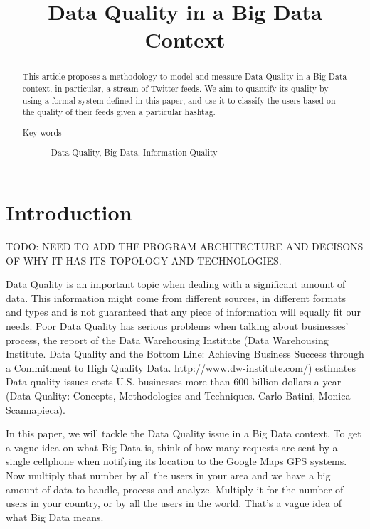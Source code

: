 \documentclass[%
 reprint,
 amsmath,amssymb,
 aps,
]{revtex4-1}
\begin{document}

\title{Data Quality in a Big Data Context}%

\begin{abstract}
This article proposes a methodology to model and measure Data Quality in a Big Data context, in particular, a stream of Twitter feeds. We aim to quantify its quality by using a formal system defined in this paper, and use it to classify the users based on the quality of their feeds given a particular hashtag.
\begin{description}
\item[Key words]
Data Quality, Big Data, Information Quality
\end{description}
\end{abstract}

\maketitle


\section{\label{sec:level1}Introduction}

TODO: NEED TO ADD THE PROGRAM ARCHITECTURE AND DECISONS OF WHY IT HAS ITS TOPOLOGY AND TECHNOLOGIES. 


Data Quality is an important topic when dealing with a significant amount of data. This information might come from different sources, in different formats and types and is not guaranteed that any piece of information will equally fit our needs. Poor Data Quality has serious problems when talking about businesses' process, the report of the Data Warehousing Institute (Data Warehousing Institute. Data Quality and the Bottom Line: Achieving Business Success through a Commitment to High Quality Data. http://www.dw-institute.com/) estimates Data quality issues costs U.S. businesses more than 600 billion dollars a year (Data Quality: Concepts, Methodologies and Techniques. Carlo Batini, Monica Scannapieca).

In this paper, we will tackle the Data Quality issue in a Big Data context. To get a vague idea on what Big Data is, think of how many requests are sent by a single cellphone when notifying its location to the Google Maps GPS systems. Now multiply that number by all the users in your area and we have a big amount of data to handle, process and analyze. Multiply it for the number of users in your country, or by all the users in the world. That's a vague idea of what Big Data means.
\end{document}
